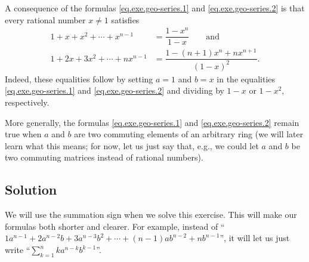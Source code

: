 \documentclass[paper=a4, fontsize=12pt]{scrartcl} %
\newcommand{\tup}[1]{\left( #1 \right)}
\let\sumnonlimits\sum
\renewcommand{\sum}{\sumnonlimits\limits}
\theoremstyle{plainsl}
\theoremstyle{definition}
\theoremstyle{remark}
\begin{document}
A consequence of the formulas
\eqref{eq.exe.geo-series.1} and \eqref{eq.exe.geo-series.2}
is that every rational number $x \neq 1$ satisfies
\begin{align*}
1 + x + x^2 + \cdots + x^{n-1} &= \dfrac{1 - x^n}{1 - x}
\qquad
\text{and} \\
1 + 2 x + 3 x^2 + \cdots + n x^{n-1}
&= \dfrac{1 - \tup{n+1} x^n + n x^{n+1}}{\tup{1 - x}^2} .
\end{align*}
Indeed, these equalities follow by setting $a = 1$ and $b = x$
in the equalities
\eqref{eq.exe.geo-series.1} and \eqref{eq.exe.geo-series.2}
and dividing by $1-x$ or $1-x^2$, respectively.

More generally, the formulas
\eqref{eq.exe.geo-series.1} and \eqref{eq.exe.geo-series.2}
remain true when $a$ and $b$ are two commuting elements of an
arbitrary ring
(we will later learn what this means; for now, let us
just say that, e.g., we could let $a$ and $b$ be two commuting
matrices instead of rational numbers).

\subsection{Solution}

We will use the summation sign when we solve this exercise.
This will make our formulas both shorter and clearer.
For example, instead of
``$1 a^{n-1} + 2 a^{n-2} b + 3 a^{n-3} b^2 + \cdots + \tup{n-1} a b^{n-2} + n b^{n-1}$'',
it will let us just write
``$\sum_{k=1}^n k a^{n-k} b^{k-1}$''.
\end{document}
